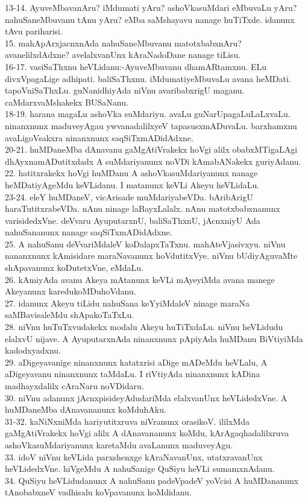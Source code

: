 \documentclass{article}
\begin{document}
13-14. AyuveMbavanAru? iMdumati yAru? ashoVkasuMdari eMbuvaLu yAru? nahuSaneMbuvanu tAnu yAru? eMba saMshayavu nanage huTiTxde. idanunx tAvu pariharisi.\\
15. mahApArxjacnxnAda nahuSaneMbuvanu matotxbabxnAru? avanelilxdAdxne? avelalxvanUnx kAraNadoDane nanage tiLisu.\\
16-17. vasiSaThxnu heVLidanu:-AyuveMbuvanu dhamARtamxnu. ELu divxVpagaLige adhipati. baliSaThxnu. iMdumatiyeMbuvaLu avana heMDati. tapoVniSaThxLu. guNanidhiyAda niVnu avaribabxrigU maganu. caMdarxvaMshakekx BUSaNanu.\\
18-19. harana magaLu ashoVka suMdariyu. avaLu  guNarUpagaLuLaLxvaLu. ninanxnunx maduveyAgau ywvanadalilxyeV tapasusxmADuvaLu. barxhamxnu avaLigoVsakxra ninanxnunx saqSiTxmADidAdxne.\\
20-21. huMDaneMba dAnavanu gaMgAtiVrakekx hoVgi alilx obabxMTigaLAgi dhAyxnamADutitxdadx A suMdariyanunx noVDi kAmabANakekx guriyAdanu.\\
22. hatitxrakekx hoVgi huMDanu A ashoVkasuMdariyanunx nanage heMDatiyAgeMdu keVLidanu. I matanunx keVLi Akeyu heVLidaLu.\\
23-24. eleY huMDaneV, vicArisade muMdariyabeVDa. bAribArigU haraTutitxrabeVDa. nAnu ninage laBayxLalalx. nAnu matotxbabxnanunx varisidedxVne. deVvaru AyuputarxnU, baliSaThxnU, jAcnxniyU Ada nahuSananunx nanage saqSiTxmADidAdxne.\\
25. A nahuSanu deVvariMdaleV koDalapxTaTxnu. mahAteVjasivxyu. niVnu nananxnunx kAmisidare maraNavanunx hoVdutitxVye. niVnu bUdiyAguvaMte shApavanunx koDutetxVne, eMdaLu.\\
26. kAmiyAda avanu Akeya mAtanunx keVLi mAyeyiMda avana manege Akeyanunx karedukoMDuhoVdanu.\\
27. idanunx Akeyu tiLidu nahuSana keYyiMdaleV ninage maraNa saMBavisaleMdu shApakoTaTxLu.\\
28. niVnu huTuTxvudakekx modalu Akeyu huTiTxdaLu. niVnu heVLidudu elalxvU nijave. A AyuputarxnAda ninanxnunx pApiyAda huMDanu BiVtiyiMda kadodxyadxnu.\\
29. aDigeyavanige ninanxnunx katatxrisi aDige mADeMdu heVLalu, A aDigeyavanu ninanxnunx taMdaLu. I riVtiyAda ninanxnunx kADina madhayxdalilx cAraNaru noVDidaru.\\
30. niVnu adanunx jAcnxpisideyAdudariMda elalxvanUnx heVLidedxVne. A huMDaneMba dAnavananunx koMduhAku.\\
31-32. kaNiNxniMda hariyutitxruva niVranunx orasikoV. ililxMda gaMgAtiVrakekx hoVgi alilx A dAnavananunx koMdu, kArAgaqhadalilxruva ashoVkasuMdariyanunx karetaMdu avaLanunx maduveyAgu.\\
33. idoV niVnu keVLida parxshenxge kAraNavanUnx, utatxravanUnx heVLidedxVne. hiVgeMdu A nahuSanige QuSiyu heVLi sumamxnAdanu.\\
34. QuSiyu heVLidudanunx A nahuSanu padeVpadeV yoVcisi A huMDananunx tAnobabxneV vadhisalu koVpavanunx hoMdidanu.
\end{document}
